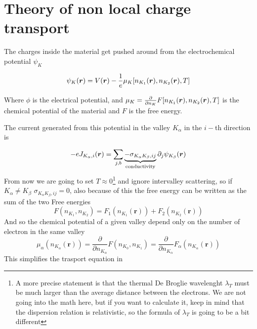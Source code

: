 \section{Theory of non local charge transport}

The charges inside the material get pushed around from the electrochemical potential $\psi_K$


\begin{equation}
    \psi_{K}(\boldsymbol{r})= V(\boldsymbol{r})-\frac 1e \mu_K[n_{K_1}(\boldsymbol{r}),n_{K_2}(\boldsymbol{r}),T]
\end{equation}

Where $\phi$ is the electrical potential, and $\mu_K=\frac {\partial}{\partial n_{K}}F[n_{K_1}(\boldsymbol{r}),n_{K_2}(\boldsymbol{r}),T]$ is the chemical potential of the material and $F$ is the free energy.

The current generated from this potential in the valley $K_\alpha$ in the $i-$th direction is

\begin{equation}
    -eJ_{K_\alpha,i}(\boldsymbol{r})= \sum_{j,b} \underbrace{-\sigma_{K_\alpha K_\beta ,ij}}_{\textrm{conductivity}}\partial_j\psi_{K_\beta }(\boldsymbol{r})
\end{equation}
From now we are going to set $T\approx 0$\footnote{A more precise statement is that the thermal De Broglie wavelenght $\lambda_T$ must be much larger than the average distance between the electrons. We are not going into the math here, but if you want to calculate it, keep in mind that the dispersion relation is relativistic, so the formula of $\lambda_T$ is going to be a bit different}
and ignore intervalley scattering, so if $K_\alpha \neq K_\beta $ $\sigma_{K_\alpha K_\beta ,ij}=0$, also because of this the free energy can be written as the sum of the two Free energies
\begin{equation}
    F(n_{K_1},n_{K_2})=F_1(n_{K_1}(\mathbf r))+F_2(n_{K_2}(\mathbf r))
\end{equation}
And so the chemical potential of a given valley depend only on the number of electron in the same valley
\begin{equation}
    \mu_\alpha(n_{K_\alpha}(\mathbf r))=\frac{\partial}{\partial n_{K_\alpha}}F(n_{K_0},n_{K_1})=\frac{\partial}{\partial n_{K_\alpha}}F_\alpha(n_{K_\alpha}(\mathbf r))
\end{equation}
This simplifies the trasport equation in 

